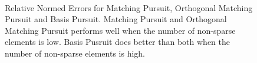 \documentclass[12pt, leqno]{article}
\begin{document}
\begin{figure}
{\label{fig:ne30m}}
\\
\caption{Relative Normed Errors for Matching Pursuit, Orthogonal Matching Pursuit and Basis Pursuit.  Matching Pursuit and Orthogonal Matching Pursuit performs well when the number of non-sparse elements is low. Basis Pusruit does better than both when the number of non-sparse elements is high.}
\end{figure}
\end{document}
